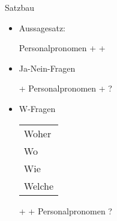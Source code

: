 \begin{syntax}{Satzbau}{}
\begin{itemize}
	\item Aussagesatz:
		\begin{mdframed}
			Personalpronomen + \verbhere + \fillhere
		\end{mdframed}
	\item Ja-Nein-Fragen
		\begin{mdframed}
			\verbhere + Personalpronomen + \fillhere ?
		\end{mdframed}
	\item W-Fragen
		\begin{mdframed}
			\begin{tabular}{l}
				Woher \\
				Wo \\
				Wie \\
				Welche
			\end{tabular} + \verbhere + Personalpronomen ?
		\end{mdframed}
\end{itemize}
\end{syntax}
